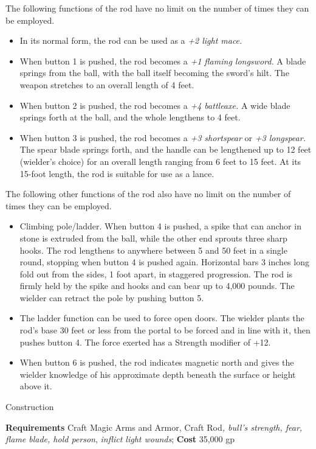 The following functions of the rod have no limit on the number of times they can be employed.
				\begin{itemize}\item  In its normal form, the rod can be used as a \textit{+2 light mace.}
				\item  When button 1 is pushed, the rod becomes a \textit{+1 flaming longsword.} A blade springs from the ball, with the ball itself becoming the sword's hilt. The weapon stretches to an overall length of 4 feet.
				\item  When button 2 is pushed, the rod becomes a \textit{+4 battleaxe.} A wide blade springs forth at the ball, and the whole lengthens to 4 feet.
				\item  When button 3 is pushed, the rod becomes a \textit{+3 shortspear} or \textit{+3 longspear.} The spear blade springs forth, and the handle can be lengthened up to 12 feet (wielder's choice) for an overall length ranging from 6 feet to 15 feet. At its 15-foot length, the rod is suitable for use as a lance.
\end{itemize}
				
The following other functions of the rod also have no limit on the number of times they can be employed.
				\begin{itemize}\item  Climbing pole/ladder. When button 4 is pushed, a spike that can anchor in stone is extruded from the ball, while the other end sprouts three sharp hooks. The rod lengthens to anywhere between 5 and 50 feet in a single round, stopping when button 4 is pushed again. Horizontal bars 3 inches long fold out from the sides, 1 foot apart, in staggered progression. The rod is firmly held by the spike and hooks and can bear up to 4,000 pounds. The wielder can retract the pole by pushing button 5.
				\item  The ladder function can be used to force open doors. The wielder plants the rod's base 30 feet or less from the portal to be forced and in line with it, then pushes button 4. The force exerted has a Strength modifier of +12.
				\item  When button 6 is pushed, the rod indicates magnetic north and gives the wielder knowledge of his approximate depth beneath the surface or height above it. 
\end{itemize}
				
Construction
				
\textbf{Requirements} Craft Magic Arms and Armor, Craft Rod\textit{, bull's strength, fear, flame blade, hold person}, \textit{inflict light wounds}; \textbf{Cost }35,000 gp
				

